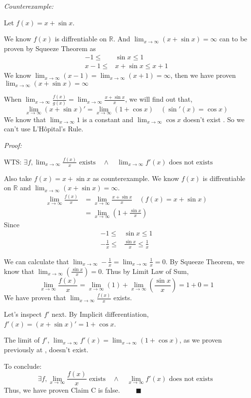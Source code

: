 \documentclass[12pt]{exam}
\newcommand*\circled[1]{\tikz[baseline=(char.base)]{
    \node[shape=circle, draw, inner sep=1pt, 
        minimum height=12pt] (char) {#1};}}
\newcommand{\R}{\mathbb{R}}
\begin{document}
\begin{enumerate}
\begin{enumerate}
			\emph{Counterexample:}
			
			Let $f(x)=x+\sin{x}$.
			
			We know $f(x)$ is diffrentiable on $\R$.
			And $\lim_{x \to \infty}(x+\sin{x})=\infty$ can to be proven by Squeeze Theorem as
			\begin{align*}
			    -1\leq&\sin{x}\leq 1\\
			    x-1\leq&x+\sin{x}\leq x+1
			\end{align*}
			We know $\lim_{x \to \infty}(x-1)=\lim_{x \to \infty}(x+1)=\infty$, then we have proven $\lim_{x \to \infty}(x+\sin{x})=\infty$ \circled{6}
			
			When $\lim_{x \to \infty}\frac{f(x)}{g(x)}=\lim_{x \to \infty}\frac{x+\sin{x}}{x}$, we will find out that,
			$$
			    \lim_{x \to \infty}(x+\sin{x})'=\lim_{x \to \infty}(1+\cos{x})\quad(\sin'(x)=\cos{x})
			$$
			We know that $\lim_{x \to \infty}1$ is a constant and $\lim_{x \to \infty}\cos{x}$ doesn't exist \circled{7}. So we can't use L'H\^{o}pital's Rule.
			
			\emph{Proof:}

			WTS: $\exists f, \lim_{x \to \infty} \frac{f(x)}{x} \mbox{ exists} \quad \land \quad \lim_{x \to \infty} f'(x) \mbox{ does not exists }$
			
			Also take $f(x)=x+\sin{x}$ as counterexample.
			We know $f(x)$ is diffrentiable on $\R$ and $\lim_{x \to \infty}(x+\sin{x})=\infty$. \circled{6}
			\begin{align*}
			    \lim_{x \to \infty}\frac{f(x)}{x}&=\lim_{x \to \infty}\frac{x+\sin{x}}{x}\quad(f(x)=x+\sin{x})\\
			    &=\lim_{x \to \infty}(1+\frac{\sin{x}}{x})
			\end{align*}
			Since
		    \begin{align*}
		        -1\leq&\sin{x}\leq1\\
		        -\frac{1}{x}\leq&\frac{\sin{x}}{x}\leq\frac{1}{x}
		     \end{align*}
		
		    We can calculate that $\lim_{x \to \infty}-\frac{1}{x}=\lim_{x \to \infty}\frac{1}{x}=0$. By Squeeze Theorem, we know that $\lim_{x \to \infty}(\frac{\sin{x}}{x})=0$. Thus by     Limit Law of Sum,
		    $$
		        \lim_{x \to \infty} \frac{f(x)}{x}=\lim_{x \to \infty}(1)+\lim_{x \to \infty}(\frac{\sin{x}}{x})=1+0=1
		    $$
			We have proven that $\lim_{x \to \infty} \frac{f(x)}{x}$ exists.
			
			Let's inspect $f'$ next. By Implicit differentiation, $f'(x)=(x+\sin{x})'=1+\cos{x}$.
		    
			The limit of $f'$, $\lim_{x \to \infty}f'(x)=\lim_{x \to \infty}(1+\cos{x})$, as we proven previously at \circled{7}, doesn't exist.
			
			To conclude:
		    $$
				\exists f, \lim_{x \to \infty} \frac{f(x)}{x} \mbox{ exists} \quad \land \quad \lim_{x \to \infty} f'(x) \mbox{ does not exists }
		    $$
		    Thus, we have proven Claim C is false. $\qquad\blacksquare$
		    
	\end{enumerate}

\end{enumerate}
\end{document}
